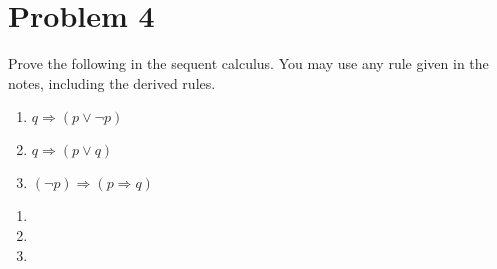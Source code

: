 \documentclass{scrartcl}
\begin{document}
\section*{Problem 4}
\begin{mdframed}
  Prove the following in the sequent calculus. You may use any rule
  given in the notes, including the derived rules.

  \begin{enumerate}[label=(\alph*)]
  \item \(q \Rightarrow (p \vee \neg p)\)
  \item \(q \Rightarrow (p \vee q)\)
  \item \((\neg p) \Rightarrow (p \Rightarrow q)\)
  \end{enumerate}
\end{mdframed}

\begin{enumerate}[label=(\alph*)]
\item 
\item 
\item 
\end{enumerate}
\end{document}
